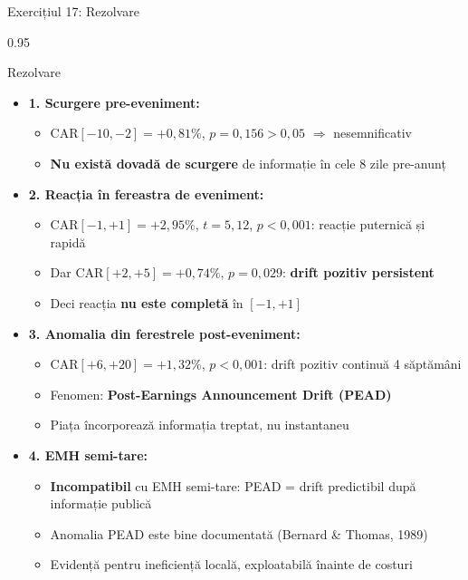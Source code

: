 \documentclass[9pt, aspectratio=169, t]{beamer}
\begin{document}
\begin{frame}[shrink=25]{Exercițiul 17: Rezolvare}
\begin{cminipage}{0.95\textwidth}
\begin{exampleblock}{Rezolvare}
\begin{itemize}\setlength{\itemsep}{0pt}
    \item \textbf{1. Scurgere pre-eveniment:}
    \begin{itemize}\setlength{\itemsep}{0pt}
        \item CAR$[-10, -2] = +0{,}81\%$, $p = 0{,}156 > 0{,}05$ $\Rightarrow$ nesemnificativ
        \item \textbf{Nu există dovadă de scurgere} de informație în cele 8 zile pre-anunț
    \end{itemize}
    \item \textbf{2. Reacția în fereastra de eveniment:}
    \begin{itemize}\setlength{\itemsep}{0pt}
        \item CAR$[-1, +1] = +2{,}95\%$, $t = 5{,}12$, $p < 0{,}001$: reacție puternică și rapidă
        \item Dar CAR$[+2, +5] = +0{,}74\%$, $p = 0{,}029$: \textbf{drift pozitiv persistent}
        \item Deci reacția \textbf{nu este completă} în $[-1, +1]$
    \end{itemize}
    \item \textbf{3. Anomalia din ferestrele post-eveniment:}
    \begin{itemize}\setlength{\itemsep}{0pt}
        \item CAR$[+6, +20] = +1{,}32\%$, $p < 0{,}001$: drift pozitiv continuă 4 săptămâni
        \item Fenomen: \textbf{Post-Earnings Announcement Drift (PEAD)}
        \item Piața încorporează informația treptat, nu instantaneu
    \end{itemize}
    \item \textbf{4. EMH semi-tare:}
    \begin{itemize}\setlength{\itemsep}{0pt}
        \item \textbf{Incompatibil} cu EMH semi-tare: PEAD = drift predictibil după informație publică
        \item Anomalia PEAD este bine documentată (Bernard \& Thomas, 1989)
        \item Evidență pentru ineficiență locală, exploatabilă înainte de costuri
    \end{itemize}
\end{itemize}
\end{exampleblock}
\end{cminipage}
\end{frame}
\end{document}
